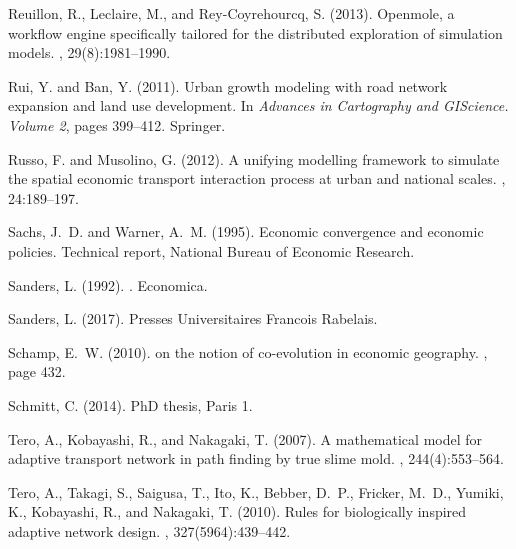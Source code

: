 \documentclass[11pt]{article}
\begin{document}
\begin{thebibliography}{}
Reuillon, R., Leclaire, M., and Rey-Coyrehourcq, S. (2013).
\newblock Openmole, a workflow engine specifically tailored for the distributed
  exploration of simulation models.
, 29(8):1981--1990.

Rui, Y. and Ban, Y. (2011).
\newblock Urban growth modeling with road network expansion and land use
  development.
\newblock In {\em Advances in Cartography and GIScience. Volume 2}, pages
  399--412. Springer.

Russo, F. and Musolino, G. (2012).
\newblock A unifying modelling framework to simulate the spatial economic
  transport interaction process at urban and national scales.
, 24:189--197.

Sachs, J.~D. and Warner, A.~M. (1995).
\newblock Economic convergence and economic policies.
\newblock Technical report, National Bureau of Economic Research.

Sanders, L. (1992).
.
\newblock Economica.

Sanders, L. (2017).
\newblock Presses Universitaires Francois Rabelais.

Schamp, E.~W. (2010).
 on the notion of co-evolution in economic geography.
, page 432.

Schmitt, C. (2014).
\newblock PhD thesis, Paris 1.

Tero, A., Kobayashi, R., and Nakagaki, T. (2007).
\newblock A mathematical model for adaptive transport network in path finding
  by true slime mold.
, 244(4):553--564.

Tero, A., Takagi, S., Saigusa, T., Ito, K., Bebber, D.~P., Fricker, M.~D.,
  Yumiki, K., Kobayashi, R., and Nakagaki, T. (2010).
\newblock Rules for biologically inspired adaptive network design.
, 327(5964):439--442.


\end{thebibliography}
\end{document}
